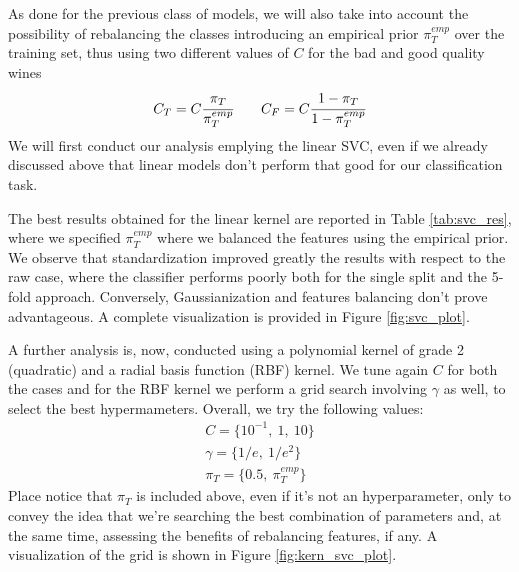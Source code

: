 As done for the previous class of models, we will also take into account the possibility of rebalancing the classes introducing an empirical prior $\pi^{emp}_{T}$ over the training set, thus using two different values of $C$ for the bad and good quality wines
\begin{align*}
	C_T = C \cfrac{\pi_T}{\pi^{emp}_{T}} \ \ \ \ \ \
	C_F = C \cfrac{1 - \pi_T}{1 - \pi^{emp}_{T}} 
\end{align*}
We will first conduct our analysis emplying the linear SVC, even if we already discussed above that linear models don't perform that good for our classification task.
 
The best results obtained for the linear kernel are reported in Table \ref{tab:svc_res}, where we specified $\pi^{emp}_T$ where we balanced the features using the empirical prior. We observe that standardization improved greatly the results with respect to the raw case, where the classifier performs poorly both for the single split and the 5-fold approach. Conversely, Gaussianization and features balancing don't prove advantageous. A complete visualization is provided in Figure \ref{fig:svc_plot}.

A further analysis is, now, conducted using a polynomial kernel of grade 2 (quadratic) and a radial basis function (RBF) kernel. We tune again $C$ for both the cases and for the RBF kernel we perform a grid search involving $\gamma$ as well, to select the best hypermameters. Overall, we try the following values:
\begin{align*}
	C = \{10^{-1}, \ 1, \ 10\} \\
	\gamma = \{1/e, \ 1/e^2\} \\
	\pi_T = \{0.5, \ \pi^{emp}_T\}
\end{align*}
Place notice that $\pi_T$ is included above, even if it's not an hyperparameter, only to convey the idea that we're searching the best combination of parameters and, at the same time, assessing the benefits of rebalancing features, if any. A visualization of the grid is shown in Figure \ref{fig:kern_svc_plot}.


